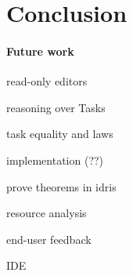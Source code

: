 
\section{Conclusion}

\paragraph{Future work}

\begin{itemize*}
  \item read-only editors
  \item reasoning over Tasks
  \item task equality and laws
  \item implementation (??)
  \item prove theorems in idris
  \item resource analysis
  \item end-user feedback
  \item IDE
\end{itemize*}
